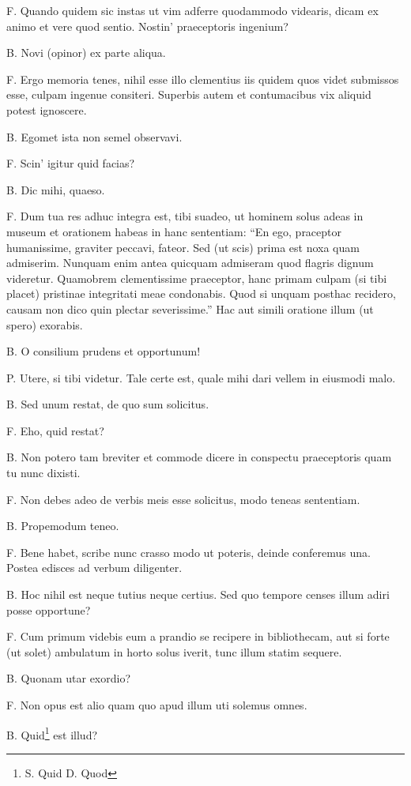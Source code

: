 \documentclass{article}
\begin{document}
F. Quando quidem sic instas ut vim adferre quodammodo videaris, dicam ex animo et vere quod sentio. Nostin' praeceptoris ingenium?

B. Novi (opinor) ex parte aliqua.

F. Ergo memoria tenes, nihil esse illo clementius iis quidem quos videt submissos esse, culpam ingenue consiteri. Superbis autem et contumacibus vix aliquid potest ignoscere.

B. Egomet ista non semel observavi.

F. Scin' igitur quid facias?

B. Dic mihi, quaeso.

F. Dum tua res adhuc integra est, tibi suadeo, ut hominem solus adeas in museum et orationem habeas in hanc sententiam: ``En ego, praceptor humanissime, graviter peccavi, fateor. Sed (ut scis) prima est noxa quam admiserim. Nunquam enim antea quicquam admiseram quod flagris dignum videretur. Quamobrem clementissime praeceptor, hanc primam culpam (si tibi placet) pristinae integritati meae condonabis. Quod si unquam posthac recidero, causam non dico quin plectar severissime.'' Hac aut simili oratione illum (ut spero) exorabis.

B. O consilium prudens et opportunum!

P. Utere, si tibi videtur. Tale certe est, quale mihi dari vellem in eiusmodi malo.

B. Sed unum restat, de quo sum solicitus.

F. Eho, quid restat?

B. Non potero tam breviter et commode dicere in conspectu praeceptoris quam tu nunc dixisti.

F. Non debes adeo de verbis meis esse solicitus, modo teneas sententiam.

B. Propemodum teneo.

F. Bene habet, scribe nunc crasso modo ut poteris, deinde conferemus una. Postea edisces ad verbum diligenter.

B. Hoc nihil est neque tutius neque certius. Sed quo tempore censes illum adiri posse opportune?

F. Cum primum videbis eum a prandio se recipere in bibliothecam, aut si forte (ut solet) ambulatum in horto solus iverit, tunc illum statim sequere.

B. Quonam utar exordio?

F. Non opus est alio quam quo apud illum uti solemus omnes.

B. Quid\footnote{S. Quid D. Quod} est illud?
\end{document}
